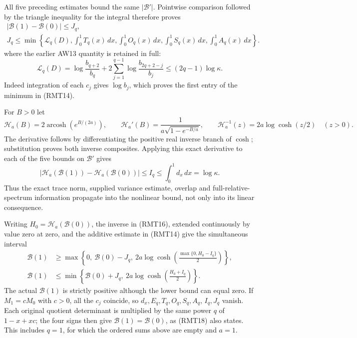 All five preceding estimates bound the same \(|\mathcal B'|\).
Pointwise comparison followed by the triangle inequality
for the integral therefore proves
\[
 \begin{gathered}
 |\mathcal B(1)-\mathcal B(0)|\leq J_q,\\
 J_q\leq
 \min\left\{\mathcal L_q(D),\int_0^1T_q(x)\,dx,
             \int_0^1O_q(x)\,dx,\int_0^1S_q(x)\,dx,
                         \int_0^1A_q(x)\,dx\right\}.
 \end{gathered}
 \tag{RMT14}
\]
where the earlier AW13 quantity is retained in full:
\[
 \mathcal L_q(D)=\log\frac{b_{q+2}}{b_q}
       +2\sum_{j=1}^{q-1}\log\frac{b_{2q+2-j}}{b_j}
       \leq(2q-1)\log\kappa.
 \tag{RMT15}
\]
Indeed integration of each \(c_j\) gives \(\log b_j\),
which proves the first entry of the minimum in (RMT14).

For \(B>0\) let
\[
 \mathscr H_a(B)=2\operatorname{arcosh}(e^{B/(2a)}),\qquad
 \mathscr H_a'(B)=
 \frac{1}{a\sqrt{1-e^{-B/a}}},\qquad
 \mathscr H_a^{-1}(z)=2a\log\cosh(z/2)\quad(z>0).
 \tag{RMT16}
\]
The derivative follows by differentiating the positive real
inverse branch of \(\cosh\); substitution proves both inverse
composites.  Applying this exact derivative to each of the
five bounds on \(\mathcal B'\) gives
\[
 |\mathscr H_a(\mathcal B(1))-\mathscr H_a(\mathcal B(0))|
 \leq I_q\leq\int_0^1d_x\,dx=\log\kappa.
 \tag{RMT17}
\]
Thus the exact trace norm, supplied variance estimate, overlap
and full-relative-spectrum information propagate into the nonlinear bound,
not only into its linear consequence.

Writing \(H_0=\mathscr H_a(\mathcal B(0))\), the inverse
in (RMT16), extended continuously by value zero at zero,
and the additive estimate in (RMT14) give the simultaneous
interval
\[
 \begin{split}
 \mathcal B(1)&\geq
 \max\left\{0,\ \mathcal B(0)-J_q,\
   2a\log\cosh\left(\frac{\max\{0,H_0-I_q\}}2\right)\right\},\\
 \mathcal B(1)&\leq
 \min\left\{\mathcal B(0)+J_q,\
   2a\log\cosh\left(\frac{H_0+I_q}2\right)\right\}.
 \end{split}
 \tag{RMT18}
\]
The actual \(\mathcal B(1)\) is strictly positive although
the lower bound can equal zero.  If \(M_1=cM_0\) with
\(c>0\), all the \(c_j\) coincide, so \(d_x,E_q,T_q,O_q,S_q,A_q\),
\(I_q,J_q\) vanish.  Each original quotient determinant is
multiplied by the same power \(q\) of \(1-x+xc\);
the four signs then give \(\mathcal B(1)=\mathcal B(0)\),
as (RMT18) also states.  This includes \(q=1\), for which
the ordered sums above are empty and \(a=1\).

